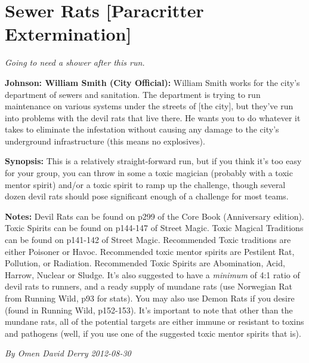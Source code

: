 \documentclass[letterpaper,twocolumn,10.5pt]{article}
\newenvironment{scenario}[6]
	{
		\section{#1 {\small[#2]}}
		\textit{#3}
		\def\TMPSCENARIO{#4 #5}
	}
	{\small\textit{By \TMPSCENARIO}}
\newcommand{\johnson}[2]{\textbf{Johnson: #1 (#2):}}
\newcommand{\synopsis}{\textbf{Synopsis: }}
\newcommand{\notes}{\textbf{Notes: }}
\begin{document}
\begin{scenario}{Sewer Rats}
	{Paracritter Extermination}
	{ Going to need a shower after this run.}
	{Omen David Derry}
	{2012-08-30}
	{https://forum.rpg.net/showthread.php?321504-Shadowrun-4th-101-Instant-Scenarios\&p=15842674#post15842674}

\johnson{William Smith}{City Official} 
William Smith works for the city's department of sewers and sanitation. The department is trying to run maintenance on various systems under the streets of [the city], but they've run into problems with the devil rats that live there. He wants you to do whatever it takes to eliminate the infestation without causing any damage to the city's underground infrastructure (this means no explosives).

\synopsis
This is a relatively straight-forward run, but if you think it's too easy for your group, you can throw in some a toxic magician (probably with a toxic mentor spirit) and/or a toxic spirit to ramp up the challenge, though several dozen devil rats should pose significant enough of a challenge for most teams.

\notes
Devil Rats can be found on p299 of the Core Book (Anniversary edition). Toxic Spirits can be found on p144-147 of Street Magic. Toxic Magical Traditions can be found on p141-142 of Street Magic. Recommended Toxic traditions are either Poisoner or Havoc. Recommended toxic mentor spirits are Pestilent Rat, Pollution, or Radiation. Recommended Toxic Spirits are Abomination, Acid, Harrow, Nuclear or Sludge. It's also suggested to have a \textit{minimum} of 4:1 ratio of devil rats to runners, and a ready supply of mundane rats (use Norwegian Rat from Running Wild, p93 for stats). You may also use Demon Rats if you desire (found in Running Wild, p152-153). It's important to note that other than the mundane rats, all of the potential targets are either immune or resistant to toxins and pathogens (well, if you use one of the suggested toxic mentor spirits that is).

\end{scenario}
\end{document}
